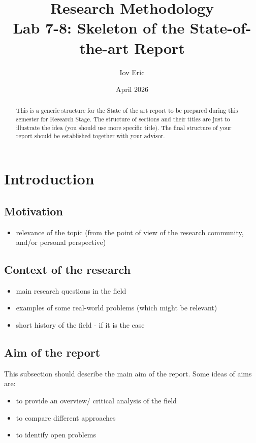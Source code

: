 \documentclass{article}
\title{Research Methodology \\ Lab 7-8: Skeleton of the State-of-the-art Report}
\author{Iov Eric}
\date{April 2026}
\begin{document}
\maketitle

\begin{abstract}
    This is a generic structure for the State of the art report to be prepared during this semester for Research Stage. The structure of sections and their titles are just to illustrate the idea (you should use more specific title). The final structure of your report should be established together with your advisor.  
    
\end{abstract}


\section{Introduction}
\subsection{Motivation}
\begin{itemize}
\item relevance of the topic (from the point of view of the research community, and/or personal perspective) 
\end{itemize}

\subsection{Context of the research}

\begin{itemize}
\item main research questions in the field

\item examples of some real-world problems (which might be relevant)

\item  short history of the field - if it is the case

\end{itemize}

\subsection{Aim of the report}
This subsection should describe the main aim of the report. Some ideas of aims are:
\begin{itemize}
\item to provide an overview/ critical analysis of the field

\item to compare different approaches

\item to identify open problems 
\end{itemize}
\end{document}
